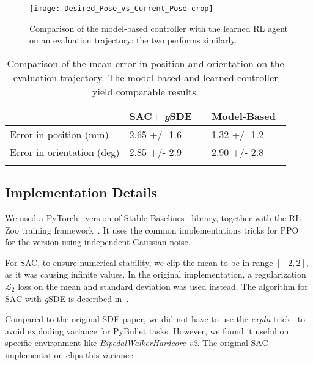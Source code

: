 \documentclass{article}
\newcommand{\SDE}{\textsc{SDE}\xspace}
\newcommand{\ourSDE}{\textit{g}\textsc{SDE}\xspace}
\newcommand{\ppo}{\textsc{PPO}\xspace}
\newcommand{\sac}{\textsc{SAC}\xspace}
\begin{document}
\begin{figure}[h!]
  \centering\texttt{[image: Desired\_Pose\_vs\_Current\_Pose-crop]}
  \label{fig:eval-traj-big}
  \caption{Comparison of the model-based controller with the learned RL agent on an evaluation trajectory: the two performs similarly.}
\end{figure}

\begin{table}[h!]
\renewcommand{\arraystretch}{1.2}
\centering
\begin{tabular}{@{}l l c l@{}}

\toprule
& \sac + \ourSDE & \phantom{abc} & Model-Based~\citep{deutschmann2017position}\\
  \midrule
 Error in position (mm) & 2.65 +/- 1.6 & & 1.32 +/- 1.2 \\
 Error in orientation (deg) & 2.85 +/- 2.9 & & 2.90 +/- 2.8 \\
\bottomrule \\
\end{tabular}

\caption{Comparison of the mean error in position and orientation on the evaluation trajectory. The model-based and learned controller yield comparable results.}
\label{tab:res-eval-traj}
\end{table}


\subsection{Implementation Details}
\label{sec:implementation}

We used a PyTorch~\citep{raffin2019baselines3} version of Stable-Baselines~\citep{hill2018stable} library, together with the RL Zoo training framework~\citep{raffin2020zoo3}.
It uses the common implementations tricks for \ppo~\citep{engstrom2020implementation} for the version using independent Gaussian noise.

For \sac, to ensure numerical stability, we clip the mean to be in range $[-2, 2]$, as it was causing infinite values. In the original implementation, a regularization $\mathcal{L}_2$ loss on the mean and standard deviation was used instead. The algorithm for \sac with \ourSDE is described in~.

Compared to the original \SDE paper, we did not have to use the \textit{expln} trick~\citep{ruckstiess2008state} to avoid exploding variance for PyBullet tasks. However, we found it useful on specific environment like \textit{BipedalWalkerHardcore-v2}. The original \sac implementation clips this variance.
\end{document}
